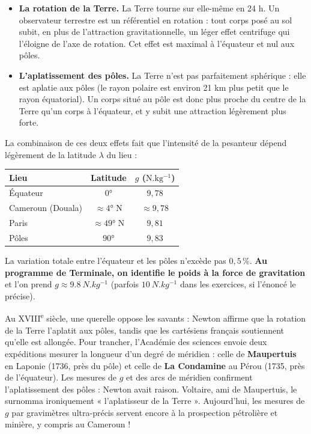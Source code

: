 \documentclass[11pt]{article}
\begin{document}
\begin{itemize}
\item \textbf{La rotation de la Terre.} La Terre tourne sur elle-même en 24 h. Un observateur terrestre est un référentiel en rotation : tout corps posé au sol subit, en plus de l'attraction gravitationnelle, un léger effet centrifuge qui l'éloigne de l'axe de rotation. Cet effet est maximal à l'équateur et nul aux pôles.
\item \textbf{L'aplatissement des pôles.} La Terre n'est pas parfaitement sphérique : elle est aplatie aux pôles (le rayon polaire est environ 21 km plus petit que le rayon équatorial). Un corps situé au pôle est donc plus proche du centre de la Terre qu'un corps à l'équateur, et y subit une attraction légèrement plus forte.
\end{itemize}

\begin{propriete}
La combinaison de ces deux effets fait que l'intensité de la pesanteur dépend légèrement de la latitude $\lambda$ du lieu :
\begin{center}
\begin{tabular}{|l|c|c|}
\hline
\rowcolor{popblueL} \textbf{Lieu} & \textbf{Latitude} & $g$ ($\mathrm{N.kg^{-1}}$) \\
\hline
Équateur & $0°$ & $9{,}78$ \\
\hline
Cameroun (Douala) & $\approx 4°$ N & $\approx 9{,}78$ \\
\hline
Paris & $\approx 49°$ N & $9{,}81$ \\
\hline
Pôles & $90°$ & $9{,}83$ \\
\hline
\end{tabular}
\end{center}
La variation totale entre l'équateur et les pôles n'excède pas $0{,}5\,\%$. \textbf{Au programme de Terminale, on identifie le poids à la force de gravitation} et l'on prend $g \approx \SI{9,8}{N.kg^{-1}}$ (parfois $\SI{10}{N.kg^{-1}}$ dans les exercices, si l'énoncé le précise).
\end{propriete}

\begin{savaistu}
Au XVIII\textsuperscript{e} siècle, une querelle oppose les savants : Newton affirme que la rotation de la Terre l'aplatit aux pôles, tandis que les cartésiens français soutiennent qu'elle est allongée. Pour trancher, l'Académie des sciences envoie deux expéditions mesurer la longueur d'un degré de méridien : celle de \textbf{Maupertuis} en Laponie (1736, près du pôle) et celle de \textbf{La Condamine} au Pérou (1735, près de l'équateur). Les mesures de $g$ et des arcs de méridien confirment l'aplatissement des pôles : Newton avait raison. Voltaire, ami de Maupertuis, le surnomma ironiquement « l'aplatisseur de la Terre ». Aujourd'hui, les mesures de $g$ par gravimètres ultra-précis servent encore à la prospection pétrolière et minière, y compris au Cameroun !
\end{savaistu}
\end{document}

